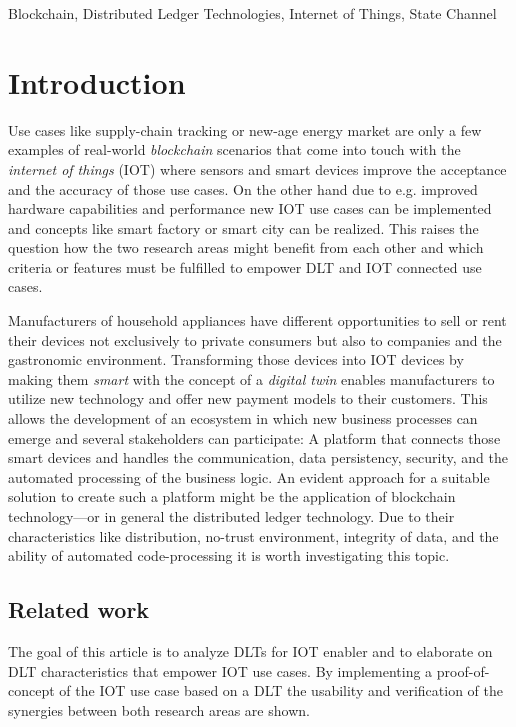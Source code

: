 \documentclass[conference]{IEEEtran}
\begin{document}
\begin{IEEEkeywords}
Blockchain, Distributed Ledger Technologies, Internet of Things, State Channel
\end{IEEEkeywords}

%
\section{Introduction}

Use cases like supply-chain tracking or new-age energy market are only a few examples of real-world \emph{blockchain} scenarios that come into touch with the \emph{internet of things} (IOT) where sensors and smart devices improve the acceptance and the accuracy of those use cases. On the other hand due to e.g. improved hardware capabilities and performance new IOT use cases can be implemented and concepts like smart factory or smart city can be realized. This raises the question how the two research areas might benefit from each other and which criteria or features must be fulfilled to empower DLT and IOT connected use cases.

Manufacturers of household appliances have different opportunities to sell or rent their devices not exclusively to private consumers but also to companies and the gastronomic environment. Transforming those devices into IOT devices by making them \emph{smart} with the concept of a \emph{digital twin} enables manufacturers to utilize new technology and offer new payment models to their customers. This allows the development of an ecosystem in which new business processes can emerge and several stakeholders can participate: A platform that connects those smart devices and handles the communication, data persistency, security, and the automated processing of the business logic. An evident approach for a suitable solution to create such a platform might be the application of blockchain technology---or in general the distributed ledger technology. Due to their characteristics like distribution, no-trust environment, integrity of data, and the ability of automated code-processing it is worth investigating this topic.

%
\subsection{Related work}

The goal of this article is to analyze DLTs for IOT enabler and to elaborate on DLT characteristics that empower IOT use cases. By implementing a proof-of-concept of the IOT use case based on a DLT the usability and verification of the synergies between both research areas are shown.
\end{document}
